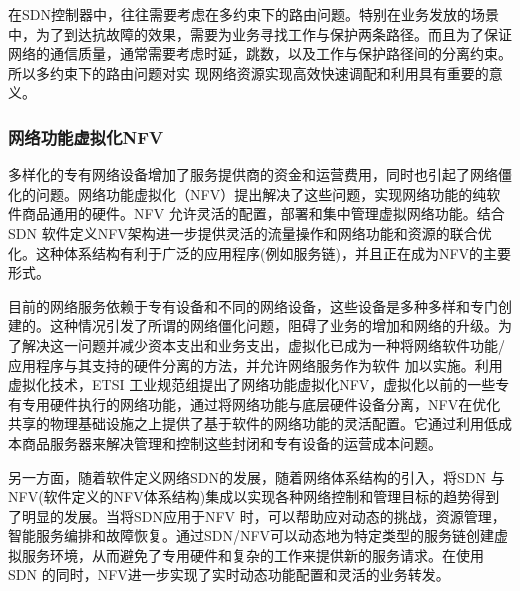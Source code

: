在SDN控制器中，往往需要考虑在多约束下的路由问题\cite{akyildiz2014roadmap}。特别在业务发放的场景中，为了到达抗故障的效果，需要为业务寻找工作与保护两条路径。而且为了保证网络的通信质量，通常需要考虑时延，跳数，以及工作与保护路径间的分离约束。所以多约束下的路由问题对实 现网络资源实现高效快速调配和利用具有重要的意义。





\subsubsection{网络功能虚拟化NFV}
多样化的专有网络设备增加了服务提供商的资金和运营费用，同时也引起了网络僵化的问题。网络功能虚拟化（NFV）提出解决了这些问题，实现网络功能的纯软件商品通用的硬件。NFV 允许灵活的配置，部署和集中管理虚拟网络功能。结合SDN 软件定义NFV架构进一步提供灵活的流量操作和网络功能和资源的联合优化。这种体系结构有利于广泛的应用程序(例如服务链)，并且正在成为NFV的主要形式。

目前的网络服务依赖于专有设备和不同的网络设备，这些设备是多种多样和专门创建的\cite{sherry2012making,wang2011untold,walfish2004middleboxes}。这种情况引发了所谓的网络僵化问题，阻碍了业务的增加和网络的升级。为了解决这一问题并减少资本支出和业务支出，虚拟化已成为一种将网络软件功能/应用程序与其支持的硬件分离的方法，并允许网络服务作为软件\cite{schaffrath2009network,chowdhury2010survey,chowdhury2009network} 加以实施。利用虚拟化技术，ETSI 工业规范组提出了网络功能虚拟化NFV，虚拟化以前的一些专有专用硬件执行的网络功能\cite{chiosi2012network,yue2013network}，通过将网络功能与底层硬件设备分离，NFV在优化共享的物理基础设施之上提供了基于软件的网络功能的灵活配置。它通过利用低成本商品服务器来解决管理和控制这些封闭和专有设备的运营成本问题。

另一方面，随着软件定义网络SDN的发展，随着网络体系结构\cite{manzalini2014software,yeganeh2013scalability,ge20145g}的引入，将SDN 与NFV(软件定义的NFV体系结构)集成以实现各种网络控制和管理目标的趋势得到了明显的发展。当将SDN应用于NFV 时，可以帮助应对动态的挑战，资源管理，智能服务编排和故障恢复。通过SDN/NFV可以动态地为特定类型的服务链创建虚拟服务环境，从而避免了专用硬件和复杂的工作来提供新的服务请求。在使用SDN 的同时，NFV进一步实现了实时动态功能配置和灵活的业务转发。

